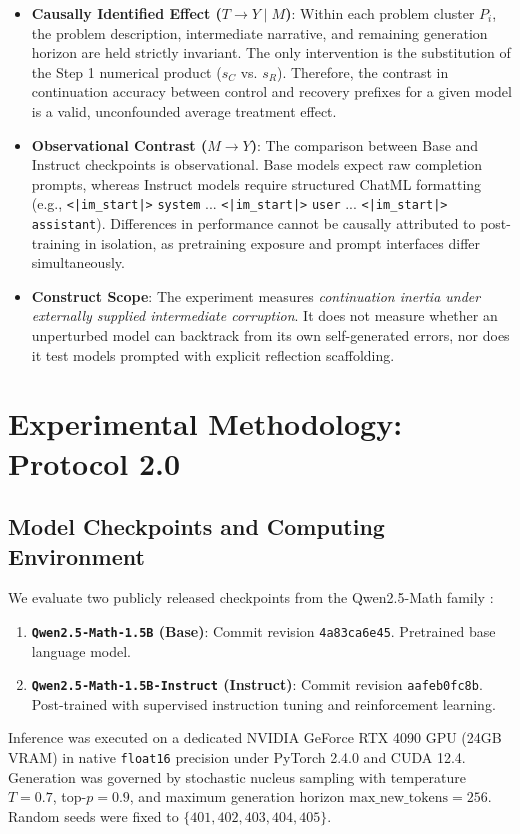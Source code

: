 \documentclass[11pt,letterpaper]{article}
\newcommand{\modelbase}{\texttt{Qwen2.5-Math-1.5B}}
\newcommand{\modelinstruct}{\texttt{Qwen2.5-Math-1.5B-Instruct}}
\begin{document}
\begin{itemize}[leftmargin=*]
    \item \textbf{Causally Identified Effect ($T \to Y \mid M$)}: Within each problem cluster $P_i$, the problem description, intermediate narrative, and remaining generation horizon are held strictly invariant. The only intervention is the substitution of the Step 1 numerical product ($s_C$ vs. $s_R$). Therefore, the contrast in continuation accuracy between control and recovery prefixes for a given model is a valid, unconfounded average treatment effect.
    \item \textbf{Observational Contrast ($M \to Y$)}: The comparison between Base and Instruct checkpoints is observational. Base models expect raw completion prompts, whereas Instruct models require structured ChatML formatting (e.g., \texttt{<|im\_start|>} \texttt{system} ... \texttt{<|im\_start|>} \texttt{user} ... \texttt{<|im\_start|>} \texttt{assistant}). Differences in performance cannot be causally attributed to post-training in isolation, as pretraining exposure and prompt interfaces differ simultaneously.
    \item \textbf{Construct Scope}: The experiment measures \textit{continuation inertia under externally supplied intermediate corruption}. It does not measure whether an unperturbed model can backtrack from its own self-generated errors, nor does it test models prompted with explicit reflection scaffolding.
\end{itemize}

\section{Experimental Methodology: Protocol 2.0}

\subsection{Model Checkpoints and Computing Environment}
We evaluate two publicly released checkpoints from the Qwen2.5-Math family \cite{qwen25math2024}:
\begin{enumerate}
    \item \textbf{\modelbase{} (Base)}: Commit revision \texttt{4a83ca6e45}. Pretrained base language model.
    \item \textbf{\modelinstruct{} (Instruct)}: Commit revision \texttt{aafeb0fc8b}. Post-trained with supervised instruction tuning and reinforcement learning.
\end{enumerate}
Inference was executed on a dedicated NVIDIA GeForce RTX 4090 GPU (24GB VRAM) in native \texttt{float16} precision under PyTorch 2.4.0 and CUDA 12.4. Generation was governed by stochastic nucleus sampling with temperature $T=0.7$, top-$p=0.9$, and maximum generation horizon $\text{max\_new\_tokens}=256$. Random seeds were fixed to $\{401, 402, 403, 404, 405\}$.
\end{document}
